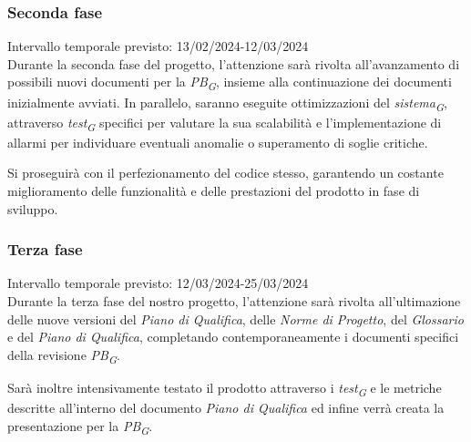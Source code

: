 \subsubsection{Seconda fase}
Intervallo temporale previsto: 13/02/2024-12/03/2024
\\ 
\vspace{0.2cm} 
Durante la seconda fase del progetto, l'attenzione sarà rivolta all’avanzamento di possibili nuovi documenti per la \textit{PB}\textsubscript{\textit{G}}, insieme alla continuazione dei documenti inizialmente avviati. In parallelo, saranno eseguite ottimizzazioni del \textit{sistema}\textsubscript{\textit{G}}, attraverso \textit{test}\textsubscript{\textit{G}} specifici per valutare la sua scalabilità e l'implementazione di allarmi per individuare eventuali anomalie o superamento di soglie critiche.

Si proseguirà con il perfezionamento del codice stesso, garantendo un costante miglioramento delle funzionalità e delle prestazioni del prodotto in fase di sviluppo.

\subsubsection{Terza fase}
Intervallo temporale previsto: 12/03/2024-25/03/2024\\ 
\vspace{0.2cm} 
Durante la terza fase del nostro progetto, l'attenzione sarà rivolta all'ultimazione delle nuove versioni del \textit{Piano di Qualifica}, delle \textit{Norme di Progetto}, del \textit{Glossario} e del \textit{Piano di Qualifica}, completando contemporaneamente i documenti specifici della revisione \textit{PB}\textsubscript{\textit{G}}.

Sarà inoltre intensivamente testato il prodotto attraverso i \textit{test}\textsubscript{\textit{G}} e le metriche descritte all'interno del documento \textit{Piano di Qualifica} ed infine verrà creata la presentazione per la \textit{PB}\textsubscript{\textit{G}}.

\vspace{0.4cm}